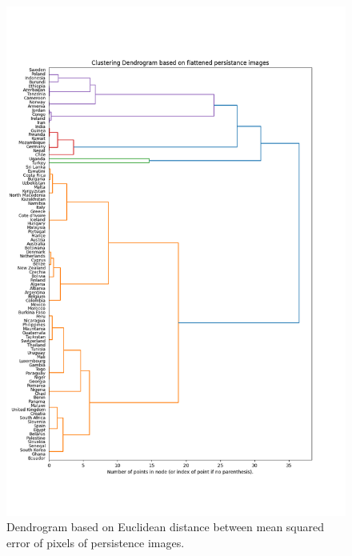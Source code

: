 \documentclass[12pt]{article}
\begin{document}
\begin{figure}[t]
	\centering
	\includegraphics[width=15cm]{mse.png}
	\caption{Dendrogram based on Euclidean distance between mean squared error of pixels of persistence images.}
\end{figure}

	
	
\end{document}

